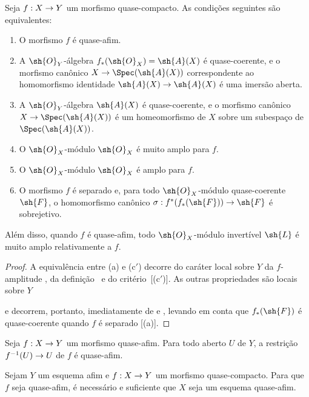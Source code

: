 \documentclass[oneside,10pt]{amsart}
\makeatletter
\newcommand{\ega@arrow}[2]{\mathchoice{#1}{#2}{#2}{#2}}
\renewcommand{\to}{\ega@arrow{\longrightarrow}{\rightarrow}}
\newcommand{\oldpage}[2][]{\marginnote{\normalfont\footnotesize\textbf{#1}~|~#2}\ignorespaces}
\let\EGAOriginalLabel\label
\renewcommand{\label}[1]{\phantomsection\EGAOriginalLabel{#1}}
\makeatother
\begin{document}
\begin{proposition}[5.1.6]
\label{II.5.1.6}
Seja $f:X\to Y$ um morfismo quase-compacto.
As condições seguintes são equivalentes:
\begin{enumerate}
  \item[{\rm(a)}] O morfismo $f$ é quase-afim.
  \item[{\rm(b)}] A $\sh{O}_Y$-álgebra $f_*(\sh{O}_X)=\sh{A}(X)$ é quase-coerente, e o morfismo canônico $X\to\Spec(\sh{A}(X))$ correspondente ao homomorfismo identidade $\sh{A}(X)\to\sh{A}(X)$  é uma imersão aberta.
  \item[{\rm(b')}] A $\sh{O}_Y$-álgebra $\sh{A}(X)$ é quase-coerente, e o morfismo canônico $X\to\Spec(\sh{A}(X))$ é um homeomorfismo de $X$ sobre um subespaço de $\Spec(\sh{A}(X))$.
  \item[{\rm(c)}] O $\sh{O}_X$-módulo $\sh{O}_X$ é muito amplo para $f$.
  \item[{\rm(c')}] O $\sh{O}_X$-módulo $\sh{O}_X$ é amplo para $f$.
  \item[{\rm(d)}] O morfismo $f$ é separado e, para todo $\sh{O}_X$-módulo quase-coerente $\sh{F}$, o homomorfismo canônico $\sigma:f^*(f_*(\sh{F}))\to\sh{F}$  é sobrejetivo.
\end{enumerate}

Além disso, quando $f$ é quase-afim, todo $\sh{O}_X$-módulo invertível $\sh{L}$ é muito amplo relativamente a $f$.
\end{proposition}

\begin{proof}
A equivalência entre (a) e (c$'$) decorre do caráter local sobre $Y$ da $f$-amplitude , da definição~ e do critério~[(c$'$)].
As outras propriedades são locais sobre $Y$

\oldpage[II]{96}
e decorrem, portanto, imediatamente de  e , levando em conta que $f_*(\sh{F})$ é quase-coerente quando $f$ é separado [(a)].
\end{proof}

\begin{corollary}[5.1.7]
\label{II.5.1.7}
Seja $f:X\to Y$ um morfismo quase-afim.
Para todo aberto $U$ de $Y$, a restrição $f^{-1}(U)\to U$ de $f$ é quase-afim.
\end{corollary}

\begin{corollary}[5.1.8]
\label{II.5.1.8}
Sejam $Y$ um esquema afim e $f:X\to Y$ um morfismo quase-compacto.
Para que $f$ seja quase-afim, é necessário e suficiente que $X$ seja um esquema quase-afim.
\end{corollary}
\end{document}
